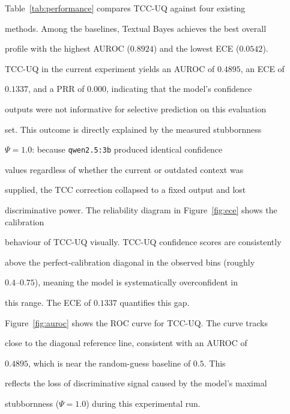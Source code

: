 \documentclass[10pt,twoside]{article}
\numberwithin{equation}{section}
\begin{document}

\vspace{-20pt} 

Table~\ref{tab:performance} compares TCC-UQ against four existing

methods. Among the baselines, Textual Bayes achieves the best overall

profile with the highest AUROC ($0.8924$) and the lowest ECE ($0.0542$).

TCC-UQ in the current experiment yields an AUROC of $0.4895$, an ECE of

$0.1337$, and a PRR of $0.000$, indicating that the model's confidence

outputs were not informative for selective prediction on this evaluation

set. This outcome is directly explained by the measured stubbornness

$\Psi = 1.0$: because \texttt{qwen2.5:3b} produced identical confidence

values regardless of whether the current or outdated context was

supplied, the TCC correction collapsed to a fixed output and lost

discriminative power. The reliability diagram in Figure~\ref{fig:ece} shows the calibration

behaviour of TCC-UQ visually. TCC-UQ confidence scores are consistently

above the perfect-calibration diagonal in the observed bins (roughly

$0.4$--$0.75$), meaning the model is systematically overconfident in

this range. The ECE of $0.1337$ quantifies this gap.

Figure~\ref{fig:auroc} shows the ROC curve for TCC-UQ. The curve tracks

close to the diagonal reference line, consistent with an AUROC of

$0.4895$, which is near the random-guess baseline of $0.5$. This

reflects the loss of discriminative signal caused by the model's maximal

stubbornness ($\Psi = 1.0$) during this experimental run.
\end{document}
